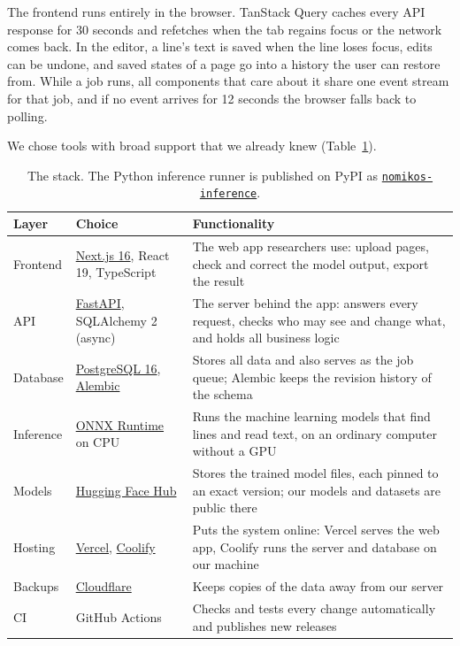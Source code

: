 \documentclass[11pt,a4paper]{article}
\begin{document}
The frontend runs entirely in the browser. TanStack Query caches every API response for 30 seconds and refetches when the tab regains focus or the network comes back. In the editor, a line's text is saved when the line loses focus, edits can be undone, and saved states of a page go into a history the user can restore from. While a job runs, all components that care about it share one event stream for that job, and if no event arrives for 12 seconds the browser falls back to polling.

We chose tools with broad support that we already knew (Table~\ref{tab:stack}).

\begin{table}[ht]
\centering
\small
\begin{tabularx}{0.95\linewidth}{@{}l l >{\raggedright\arraybackslash}X@{}}
\toprule
Layer & Choice & Functionality \\
\midrule
Frontend & \href{https://nextjs.org}{Next.js 16}, React 19, TypeScript & The web app researchers use: upload pages, check and correct the model output, export the result \\
API & \href{https://fastapi.tiangolo.com}{FastAPI}, SQLAlchemy 2 (async) & The server behind the app: answers every request, checks who may see and change what, and holds all business logic \\
Database & \href{https://www.postgresql.org}{PostgreSQL 16}, \href{https://alembic.sqlalchemy.org}{Alembic} & Stores all data and also serves as the job queue; Alembic keeps the revision history of the schema \\
Inference & \href{https://onnxruntime.ai}{ONNX Runtime} on CPU & Runs the machine learning models that find lines and read text, on an ordinary computer without a GPU \\
Models & \href{https://huggingface.co/nomikos-project}{Hugging Face Hub} & Stores the trained model files, each pinned to an exact version; our models and datasets are public there \\
Hosting & \href{https://vercel.com}{Vercel}, \href{https://coolify.io}{Coolify} & Puts the system online: Vercel serves the web app, Coolify runs the server and database on our machine \\
Backups & \href{https://www.cloudflare.com}{Cloudflare} & Keeps copies of the data away from our server \\
CI & GitHub Actions & Checks and tests every change automatically and publishes new releases \\
\bottomrule
\end{tabularx}
\caption{The stack. The Python inference runner is published on PyPI as \href{https://pypi.org/project/nomikos-inference/}{\texttt{nomikos-inference}}.}
\label{tab:stack}
\end{table}
\end{document}
